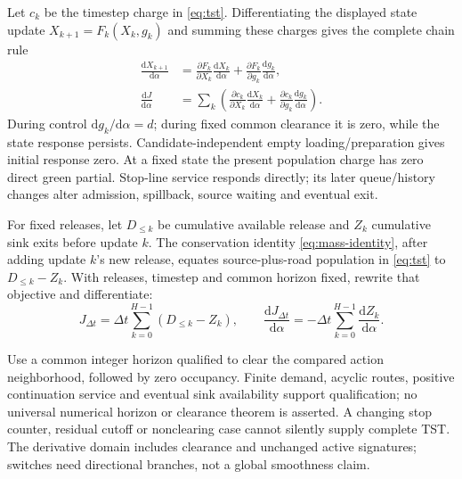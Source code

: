 \documentclass[10pt,a4paper]{article}
\newcommand{\rev}[1]{{\color{revisionred}#1}}
\begin{document}
Let $c_k$ be the timestep charge in \rev{\eqref{eq:tst}}. Differentiating
the displayed state update $X_{k+1}=F_k(X_k,g_k)$ and summing these charges
gives the complete chain rule
\begin{equation}
 \begin{aligned}
 \frac{\mathrm dX_{k+1}}{\mathrm d\alpha}
 &=\frac{\partial F_k}{\partial X_k}
            \frac{\mathrm dX_k}{\mathrm d\alpha}
  +\frac{\partial F_k}{\partial g_k}
            \frac{\mathrm dg_k}{\mathrm d\alpha},\\
 \frac{\mathrm dJ}{\mathrm d\alpha}
 &=\sum_k\left(
 \frac{\partial c_k}{\partial X_k}\frac{\mathrm dX_k}{\mathrm d\alpha}
 +\frac{\partial c_k}{\partial g_k}\frac{\mathrm dg_k}{\mathrm d\alpha}
 \right).
 \end{aligned}
 \label{eq:state-sensitivity}
\end{equation}
During control $\mathrm dg_k/\mathrm d\alpha=d$; during fixed common
clearance it is zero, while the state response persists. Candidate-independent
empty loading/preparation gives initial response zero. At a fixed state
the present population charge has zero direct green partial. Stop-line
service responds directly; its later queue/history changes alter admission,
spillback, source waiting and eventual exit.

For fixed releases, let $D_{\leq k}$ be cumulative available release and
$Z_k$ cumulative sink exits before update $k$. The conservation identity \rev{\eqref{eq:mass-identity}}, after adding
update $k$'s new release, equates source-plus-road population in
\rev{\eqref{eq:tst}} to $D_{\leq k}-Z_k$. With releases, timestep and common
\rev{horizon fixed, rewrite that objective and differentiate:}
\begin{equation}
 J_{\Delta t}=\Delta t\sum_{k=0}^{H-1}(D_{\leq k}-Z_k),\qquad
 \frac{\mathrm dJ_{\Delta t}}{\mathrm d\alpha}
 =-\Delta t\sum_{k=0}^{H-1}\frac{\mathrm dZ_k}{\mathrm d\alpha}.
 \label{eq:exit-objective}
\end{equation}
\par

Use a common integer horizon qualified to clear the compared action
neighborhood, followed by zero occupancy. Finite demand, acyclic routes,
positive continuation service and eventual sink availability support
qualification; no universal numerical horizon or clearance theorem is
asserted. A changing stop counter, residual cutoff or nonclearing case
cannot silently supply complete TST. The derivative domain includes
clearance and unchanged active signatures; switches need directional
branches, not a global smoothness claim.
\end{document}
